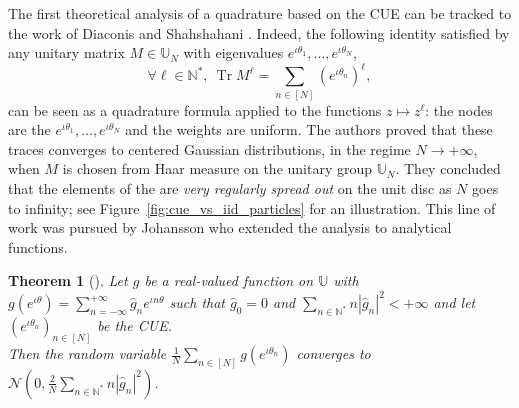 \documentclass[twoside,11pt]{book}
\newtheorem{theorem}{Theorem}
\DeclareMathOperator{\Tr}{Tr}
\DeclareMathOperator{\Det}{Det}
\begin{document}


The first theoretical analysis of a  quadrature based on the CUE can be tracked to the work of Diaconis and Shahshahani \citep{DiSh94}. Indeed, the following identity satisfied by any unitary matrix $M \in \mathbb{U}_{N}$ with eigenvalues $e^{\iota \theta_{1}}, \dots, e^{\iota \theta_{N}}$,
\begin{equation}
\forall \ell \in \mathbb{N}^{*}, \: \Tr M^{\ell}  = \sum\limits_{n \in [N]} (e^{\iota \theta_{n}})^{\ell},
\end{equation}
can be seen as a quadrature formula applied to the functions $z \mapsto z^{\ell}$: the nodes are the $e^{\iota \theta_{1}}, \dots, e^{\iota \theta_{N}}$ and the weights are uniform.
  The authors proved that these traces converges to centered Gaussian distributions, in the regime $N \rightarrow +\infty$, when $M$ is chosen from Haar measure on the unitary group $\mathbb{U}_{N}$. They concluded that the elements of the are \emph{very regularly spread out} on the unit disc as $N$ goes to infinity; see Figure~\ref{fig:cue_vs_iid_particles} for an illustration. This line of work was pursued by Johansson who extended the analysis to analytical functions.


\begin{theorem}[\cite{Joh97}]
Let $g$ be a real-valued function on $\mathbb{U}$ with $g(e^{\iota \theta}) = \sum\limits_{n =-\infty}^{+\infty} \hat{g}_{n}e^{\iota n \theta}$
 such that $\hat{g}_{0} = 0$ and $\displaystyle \sum\limits_{n \in \mathbb{N}^{*}} n|\hat{g}_{n}|^{2} <+\infty$ and let $(e^{\iota \theta_{n}})_{n \in [N]}$ be the CUE. \\
 Then the random variable $\displaystyle \frac{1}{N}\sum\limits_{n \in [N]} g(e^{\iota\theta_{n}})$
converges to $\displaystyle \mathcal{N}(0,\frac{2}{N}\sum\limits_{n \in \mathbb{N}^{*}} n|\hat{g}_{n}|^{2})$.
\end{theorem}


\end{document}
